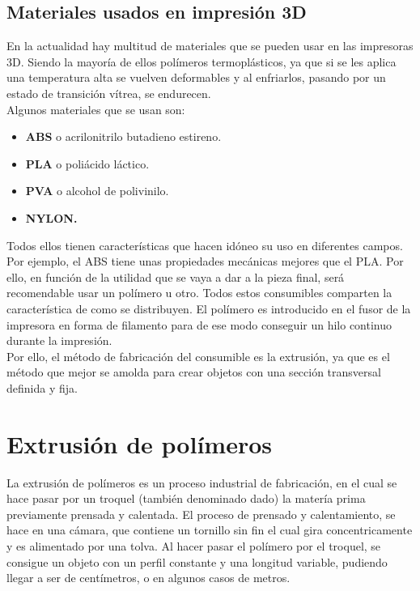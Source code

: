 \subsection{Materiales usados en impresión 3D}
\label{impreso_materiales}
En la actualidad hay multitud de materiales que se pueden usar en las impresoras 3D. Siendo la mayoría de ellos polímeros termoplásticos, ya que si se les aplica una temperatura alta se vuelven deformables y al enfriarlos, pasando por un estado de transición vítrea, se endurecen.\\

Algunos materiales que se usan son:
\begin{itemize}
    \item \textbf{ABS} o acrilonitrilo butadieno estireno.
    \item \textbf{PLA} o poliácido láctico.
    \item \textbf{PVA} o alcohol de polivinilo.
    \item \textbf{NYLON.}
\end{itemize}

Todos ellos tienen características que hacen idóneo su uso en diferentes campos. Por ejemplo, el ABS tiene unas propiedades mecánicas mejores que el PLA\cite{tfg_antonio}. Por ello, en función de la utilidad que se vaya a dar a la pieza final, será recomendable usar un polímero u otro. Todos estos consumibles comparten la característica de como se distribuyen. El polímero es introducido en el fusor de la impresora en forma de filamento para de ese modo conseguir un hilo continuo durante la impresión.\\

Por ello, el método de fabricación del consumible es la extrusión, ya que es el método que mejor se amolda para crear objetos con una sección transversal definida y fija.

\section{Extrusión de polímeros}
\label{arte_extrusion}
La extrusión de polímeros es un proceso industrial de fabricación, en el cual se hace pasar por un troquel (también denominado dado) la matería prima previamente prensada y calentada. El proceso de prensado y calentamiento, se hace en una cámara, que contiene un tornillo sin fin el cual gira concentricamente y es alimentado por una tolva. Al hacer pasar el polímero por el troquel, se consigue un objeto con un perfil constante y una longitud variable, pudiendo llegar a ser de centímetros, o en algunos casos de metros.

